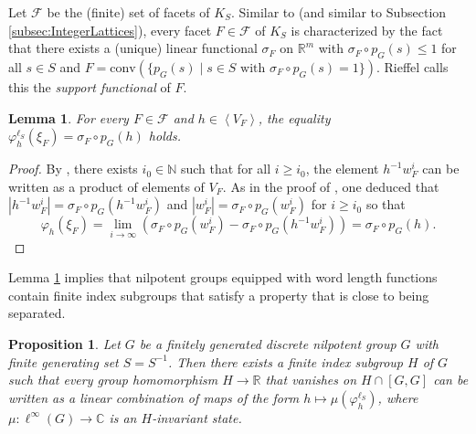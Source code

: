\documentclass[a4paper,11pt,reqno]{amsart}
\numberwithin{equation}{section}
\numberwithin{equation}{section}
\newtheorem{lemma}[theorem]{Lemma}
\newtheorem{proposition}[theorem]{Proposition}
\theoremstyle{definition}
\theoremstyle{remark}
\theoremstyle{remark}
\begin{document}
Let $\mathcal{F}$ be the (finite) set of facets of $K_{S}$. Similar
to \cite[Section 8]{Rieffel02} (and similar to Subsection \ref{subsec:IntegerLattices}),
every facet $F\in\mathcal{F}$ of $K_{S}$ is characterized by the
fact that there exists a (unique) linear functional $\sigma_{F}$
on $\mathbb{R}^{m}$ with $\sigma_{F}\circ p_G(s)\leq1$ for all $s\in S$
and $F=\text{conv}(\{p_{G}(s)\mid s\in S\text{ with }\sigma_{F}\circ p_{G}(s)=1\})$.
Rieffel calls this the \emph{support functional} of $F$.

\begin{lemma} \label{EveluationIdentity} For every $F\in\mathcal{F}$
and $h\in\left\langle V_{F}\right\rangle $, the equality $\varphi_{h}^{\ell_{S}}(\xi_{F})=\sigma_{F}\circ p_{G}(h)$
holds. \end{lemma}

\begin{proof} By \cite[Lemma 4.3]{Walsh07}, there exists $i_{0}\in\mathbb{N}$
such that for all $i\geq i_{0}$, the element $h^{-1}w_{F}^{i}$ can
be written as a product of elements of $V_{F}$. As in the proof of
\cite[Lemma 4.1]{Walsh07}, one deduced that $\left|h^{-1}w_{F}^{i}\right|=\sigma_{F}\circ p_{G}(h^{-1}w_{F}^{i})$
and $\left|w_{F}^{i}\right|=\sigma_{F}\circ p_{G}(w_{F}^{i})$ for
$i\geq i_{0}$ so that
\[
\varphi_{h}(\xi_{F})=\lim_{i\rightarrow\infty}(\sigma_{F}\circ p_{G}(w_{F}^{i})-\sigma_{F}\circ p_{G}(h^{-1}w_{F}^{i}))=\sigma_{F}\circ p_{G}(h).
\]
\end{proof}

Lemma \ref{EveluationIdentity} implies that nilpotent groups equipped
with word length functions contain finite index subgroups that satisfy a property that is close to being
separated.

\begin{proposition} \label{SeparatenessVariant}Let $G$ be a finitely
generated discrete nilpotent group $G$ with finite generating set
$S=S^{-1}$. Then there exists a finite index subgroup $H$ of $G$
such that every group homomorphism $H\rightarrow\mathbb{R}$ that
vanishes on $H\cap[G,G]$ can be written as a linear combination of
maps of the form $h\mapsto\mu(\varphi_{h}^{\ell_{S}})$, where $\mu:\ell^{\infty}(G)\rightarrow\mathbb{C}$
is an $H$-invariant state. \end{proposition}
\end{document}
